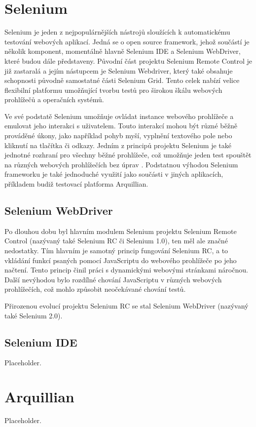 \documentclass[
    color,   %
	table,   %
    twoside, %
]{fithesis3}
\begin{document}
  \section{Selenium}
 Selenium je jeden z nejpopulárnějších nástrojů sloužících k automatickému testování webových aplikací.   Jedná se o open source framework, jehož součástí je několik komponent, momentálně hlavně Selenium IDE a Selenium WebDriver, které budou dále představeny. Původní část projektu Selenium Remote Control je již zastaralá a jejím nástupcem je Selenium Webdriver, který také obsahuje schopnosti původně samostatné části Selenium Grid. Tento celek nabízí velice flexibilní platformu umožňující tvorbu testů pro širokou škálu webových prohlížečů a operačních systémů.
 
 Ve své podstatě Selenium umožňuje ovládat instance webového prohlížeče a emulovat jeho interakci s uživatelem. Touto interakcí mohou být různé běžně prováděné úkony, jako například pohyb myší, vyplnění textového pole nebo kliknutí na tlačítka či odkazy. Jedním z principů projektu Selenium je také jednotné rozhraní pro všechny běžné prohlížeče, což umožňuje jeden test spouštět na různých webových prohlížečích bez úprav \cite{SeleniumGithub}. Podstatnou výhodou Selenium frameworku je také jednoduché využití jako součásti v jiných aplikacích, příkladem budiž testovací platforma Arquillian.
 
  \subsection{Selenium WebDriver}
   Po dlouhou dobu byl hlavním modulem Selenium projektu Selenium Remote Control (nazývaný také Selenium RC či Selenium 1.0), ten měl ale značné nedostatky. Tím hlavním je samotný princip fungování Selenium RC, a to vkládání funkcí psaných pomocí JavaScriptu do webového prohlížeče po jeho načtení. Tento princip činil práci s dynamickými webovými stránkami náročnou. Další nevýhodou bylo rozdílné chování JavaScriptu v různých webových prohlížečích, což mohlo způsobit neočekávané chování testů.
  
Přirozenou evolucí projektu Selenium RC se stal Selenium WebDriver (nazývaný také Selenium 2.0).
  \subsection{Selenium IDE}
  Placeholder.
  \section{Arquillian}
    Placeholder.
\end{document}
